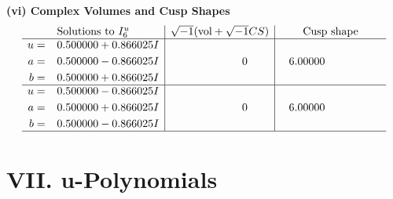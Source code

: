 \documentclass[1p]{elsarticle_modified}
\theoremstyle{definition}
\newcommand{\I}{\sqrt{-1}}
\begin{document}
\newpage\flushleft \textbf{(vi) Complex Volumes and Cusp Shapes}
$$\begin{array}{c|c|c}  
\text{Solutions to }I^u_{6}& \I (\text{vol} + \sqrt{-1}CS) & \text{Cusp shape}\\
 \hline 
\begin{aligned}
u &= \phantom{-}0.500000 + 0.866025 I \\
a &= \phantom{-}0.500000 - 0.866025 I \\
b &= \phantom{-}0.500000 + 0.866025 I\end{aligned}
 & \phantom{-0.000000 } 0 & \phantom{-}6.00000\phantom{ +0.000000I} \\ \hline\begin{aligned}
u &= \phantom{-}0.500000 - 0.866025 I \\
a &= \phantom{-}0.500000 + 0.866025 I \\
b &= \phantom{-}0.500000 - 0.866025 I\end{aligned}
 & \phantom{-0.000000 } 0 & \phantom{-}6.00000\phantom{ +0.000000I}\\
 \hline 
 \end{array}$$\newpage
\newpage\renewcommand{\arraystretch}{1}
\centering \section*{ VII. u-Polynomials}
\end{document}
